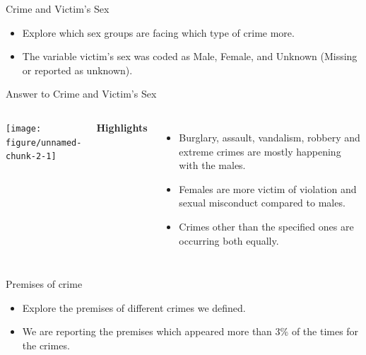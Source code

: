 \documentclass{beamer}\usepackage[]{graphicx}\usepackage[]{xcolor}
\newenvironment{knitrout}{}{} %
\begin{document}
\begin{frame}[fragile]{Crime and Victim's Sex}

\begin{itemize}
\item Explore which sex groups are facing which type of crime more.
\item The variable victim's sex was coded as Male, Female, and Unknown (Missing or reported as unknown).

\end{itemize}


\end{frame}

\begin{frame}[fragile]{Answer to Crime and Victim's Sex}
\begin{columns}
\begin{knitrout}
\color{fgcolor}
\texttt{[image: figure/unnamed-chunk-2-1]} 
\end{knitrout}

\textbf{Highlights}
\begin{itemize}
\item Burglary, assault, vandalism, robbery and extreme crimes are mostly happening with the males.
\item Females are more victim of violation and sexual misconduct compared to males. 
\item Crimes other than the specified ones are occurring both equally.

\end{itemize}

\end{columns}
\end{frame} 


\begin{frame}[fragile]{Premises of crime}

\begin{itemize}
\item Explore the premises of different crimes we defined.
\item We are reporting the premises which appeared more than 3\% of the times for the crimes.

\end{itemize}

\end{frame}
\end{document}
